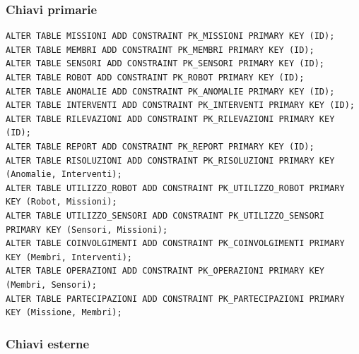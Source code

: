 \subsubsection{Chiavi primarie}

\begin{lstlisting}
ALTER TABLE MISSIONI ADD CONSTRAINT PK_MISSIONI PRIMARY KEY (ID);
ALTER TABLE MEMBRI ADD CONSTRAINT PK_MEMBRI PRIMARY KEY (ID);
ALTER TABLE SENSORI ADD CONSTRAINT PK_SENSORI PRIMARY KEY (ID);
ALTER TABLE ROBOT ADD CONSTRAINT PK_ROBOT PRIMARY KEY (ID);
ALTER TABLE ANOMALIE ADD CONSTRAINT PK_ANOMALIE PRIMARY KEY (ID);
ALTER TABLE INTERVENTI ADD CONSTRAINT PK_INTERVENTI PRIMARY KEY (ID);
ALTER TABLE RILEVAZIONI ADD CONSTRAINT PK_RILEVAZIONI PRIMARY KEY (ID);
ALTER TABLE REPORT ADD CONSTRAINT PK_REPORT PRIMARY KEY (ID);
ALTER TABLE RISOLUZIONI ADD CONSTRAINT PK_RISOLUZIONI PRIMARY KEY (Anomalie, Interventi);
ALTER TABLE UTILIZZO_ROBOT ADD CONSTRAINT PK_UTILIZZO_ROBOT PRIMARY KEY (Robot, Missioni);
ALTER TABLE UTILIZZO_SENSORI ADD CONSTRAINT PK_UTILIZZO_SENSORI PRIMARY KEY (Sensori, Missioni);
ALTER TABLE COINVOLGIMENTI ADD CONSTRAINT PK_COINVOLGIMENTI PRIMARY KEY (Membri, Interventi);
ALTER TABLE OPERAZIONI ADD CONSTRAINT PK_OPERAZIONI PRIMARY KEY (Membri, Sensori);
ALTER TABLE PARTECIPAZIONI ADD CONSTRAINT PK_PARTECIPAZIONI PRIMARY KEY (Missione, Membri);
\end{lstlisting}

\subsubsection{Chiavi esterne}

